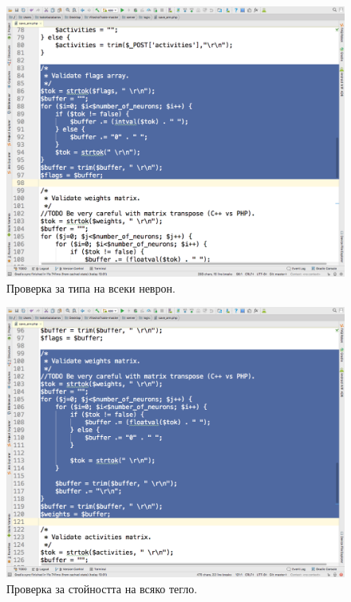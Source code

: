 \documentclass[book,14pt,oneside,openany]{memoir}
\begin{document}
\begin{figure}[h]
  \centering
  \includegraphics[height=0.45\pdfpageheight]{pic0144}
  \caption{Проверка за типа на всеки неврон.}
\label{fig:pic0144}
\end{figure}
\FloatBarrier

\begin{figure}[h]
  \centering
  \includegraphics[height=0.45\pdfpageheight]{pic0145}
  \caption{Проверка за стойността на всяко тегло.}
\label{fig:pic0145}
\end{figure}
\FloatBarrier
\end{document}
